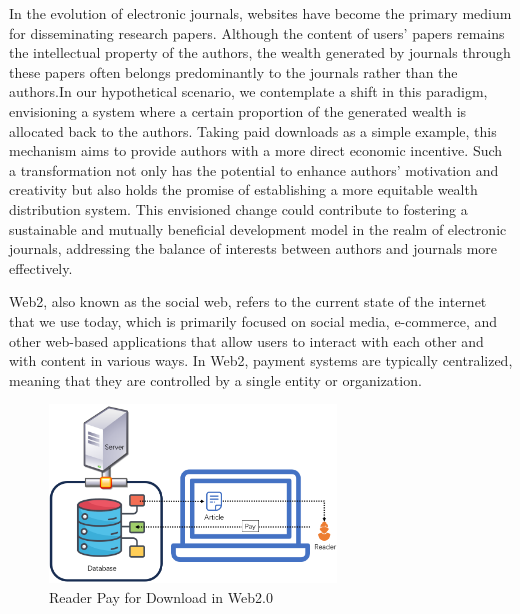 \documentclass[lettersize,journal]{IEEEtran}
\begin{document}
In the evolution of electronic journals, websites have become the primary medium for disseminating research papers. Although the content of users' papers remains the intellectual property of the authors, the wealth generated by journals through these papers often belongs predominantly to the journals rather than the authors.In our hypothetical scenario, we contemplate a shift in this paradigm, envisioning a system where a certain proportion of the generated wealth is allocated back to the authors. Taking paid downloads as a simple example, this mechanism aims to provide authors with a more direct economic incentive. Such a transformation not only has the potential to enhance authors' motivation and creativity but also holds the promise of establishing a more equitable wealth distribution system. This envisioned change could contribute to fostering a sustainable and mutually beneficial development model in the realm of electronic journals, addressing the balance of interests between authors and journals more effectively.


Web2, also known as the social web, refers to the current state of the internet that we use today, which is primarily focused on social media, e-commerce, and other web-based applications that allow users to interact with each other and with content in various ways. In Web2, payment systems are typically centralized, meaning that they are controlled by a single entity or organization. 

\begin{figure}[h]
  \includegraphics[width=3in]{assets/web2.png}
  \caption{Reader Pay for Download in Web2.0}
  \label{fig:web2}
\end{figure}
\end{document}
